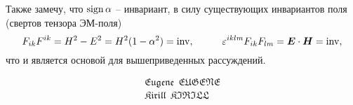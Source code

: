 Также замечу, что $\mathop{\mathrm{sign}}\nolimits \alpha$ -- инвариант, в силу существующих инвариантов поля (свертов тензора ЭМ-поля)
\begin{equation*}
	F_{ik} F^{ik} = H^2 - E^2 = H^2 (1 - \alpha^2) = \inv,
	\hspace{10 mm}
	\varepsilon^{iklm} F_{ik} F_{lm} = \vc{E} \cdot \vc{H} = \inv,
\end{equation*}
что и является основой для вышеприведенных рассуждений.

\begin{align*}
	\mathfrak{Eugene} \ \ \mathfrak{EUGENE} \\
	\mathfrak{Kirill} \ \ \mathfrak{KIRILL} 
\end{align*}